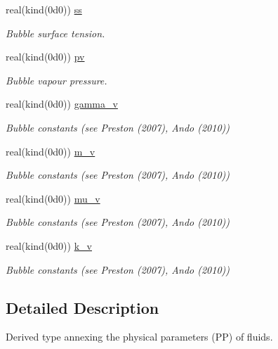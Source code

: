 \begin{DoxyCompactItemize}
real(kind(0d0)) \hyperlink{structm__derived__types_1_1physical__parameters_aabd7a1fe772c4e9a6e2f108266ebd94e}{ss}
\begin{DoxyCompactList}\small\item\em Bubble surface tension. \end{DoxyCompactList}\item 
real(kind(0d0)) \hyperlink{structm__derived__types_1_1physical__parameters_a7294e13410be9cba57955b3ab7d996a8}{pv}
\begin{DoxyCompactList}\small\item\em Bubble vapour pressure. \end{DoxyCompactList}\item 
real(kind(0d0)) \hyperlink{structm__derived__types_1_1physical__parameters_abd23a0dbe438123007b1d7d19df3c648}{gamma\+\_\+v}
\begin{DoxyCompactList}\small\item\em Bubble constants (see Preston (2007), Ando (2010)) \end{DoxyCompactList}\item 
real(kind(0d0)) \hyperlink{structm__derived__types_1_1physical__parameters_a746535809605882bd17638e8c5b091da}{m\+\_\+v}
\begin{DoxyCompactList}\small\item\em Bubble constants (see Preston (2007), Ando (2010)) \end{DoxyCompactList}\item 
real(kind(0d0)) \hyperlink{structm__derived__types_1_1physical__parameters_ae4f670160d4e4effb657407407fd33e8}{mu\+\_\+v}
\begin{DoxyCompactList}\small\item\em Bubble constants (see Preston (2007), Ando (2010)) \end{DoxyCompactList}\item 
real(kind(0d0)) \hyperlink{structm__derived__types_1_1physical__parameters_a4d91aba9648caf359524976932f83de6}{k\+\_\+v}
\begin{DoxyCompactList}\small\item\em Bubble constants (see Preston (2007), Ando (2010)) \end{DoxyCompactList}\end{DoxyCompactItemize}


\subsection{Detailed Description}
Derived type annexing the physical parameters (PP) of fluids. 


